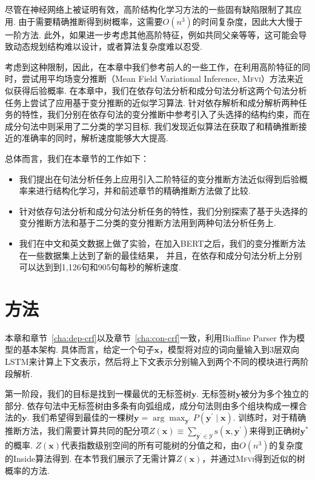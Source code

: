 尽管在神经网络上被证明有效，高阶结构化学习方法的一些固有缺陷限制了其应用.
由于需要精确推断得到树概率，这需要$O(n^3)$的时间复杂度，因此大大慢于一阶方法.
此外，如果进一步考虑其他高阶特征，例如共同父亲等等，这可能会导致动态规划结构难以设计，或者算法复杂度难以忍受.

考虑到这种限制，因此，在本章中我们参考前人的一些工作\citep{smith-eisner-2008-dependency,wang-etal-2019-second,wang-tu-2020-second}，在利用高阶特征的同时，尝试用平均场变分推断（Mean Field Variational Inference, \textsc{Mfvi}）方法来近似获得后验概率.
在本章中，我们在依存句法分析和成分句法分析这两个句法分析任务上尝试了应用基于变分推断的近似学习算法.
针对依存解析和成分解析两种任务的特性，我们分别在依存句法的变分推断中参考\cite{wang-tu-2020-second}引入了头选择的结构约束，而在成分句法中则采用了二分类的学习目标.
我们发现近似算法在获取了和精确推断接近的准确率的同时，解析速度能够大大提高.

总体而言，我们在本章节的工作如下：
\begin{itemize}
  \item 我们提出在句法分析任务上应用引入二阶特征的变分推断方法近似得到后验概率来进行结构化学习，并和前述章节的精确推断方法做了比较.
  \item 针对依存句法分析和成分句法分析任务的特性，我们分别探索了基于头选择的变分推断方法和基于二分类的变分推断方法用到两种句法分析任务上.
  \item 我们在中文和英文数据上做了实验，在加入BERT之后，我们的变分推断方法在一些数据集上达到了新的最佳结果，
        并且，在依存和成分句法分析上分别可以达到到1,126句和905句每秒的解析速度.
\end{itemize}

\section{方法}\label{sec:vi-approach}

本章和章节~\ref{cha:dep-crf}以及章节~\ref{cha:con-crf}一致，利用Biaffine Parser \citep{dozat-etal-2017-biaffine,wang-tu-2020-second}作为模型的基本架构.
具体而言，给定一个句子$\boldsymbol{x}$，模型将对应的词向量输入到3层双向LSTM来计算上下文表示，然后将上下文表示分别输入到两个不同的模块进行两阶段解析.

第一阶段，我们的目标是找到一棵最优的无标签树$\boldsymbol{y}$.
无标签树$\boldsymbol{y}$被分为多个独立的部分.
依存句法中无标签树由多条有向弧组成，成分句法则由多个组块构成一棵合法的$\boldsymbol{y}$.
我们希望得到最佳的一棵树$\boldsymbol{y}=\arg\max_{\boldsymbol{y}^{\prime}}P(\boldsymbol{y}^{\prime}\mid\boldsymbol{x})$.
训练时，对于精确推断方法，我们需要计算共同的配分项$Z(\boldsymbol{x})\equiv\sum_{\boldsymbol{y}^{\prime}\in\mathcal{Y}}\mathrm{s}(\boldsymbol{x},\boldsymbol{y}^{\prime})$来得到正确树$\boldsymbol{y}^{\ast}$的概率.
$Z(\boldsymbol{x})$代表指数级别空间的所有可能树的分值之和，由$O(n^3)$的复杂度的Inside算法得到.
在本节我们展示了无需计算$Z(\boldsymbol{x})$，并通过\textsc{Mfvi}得到近似的树概率的方法.

